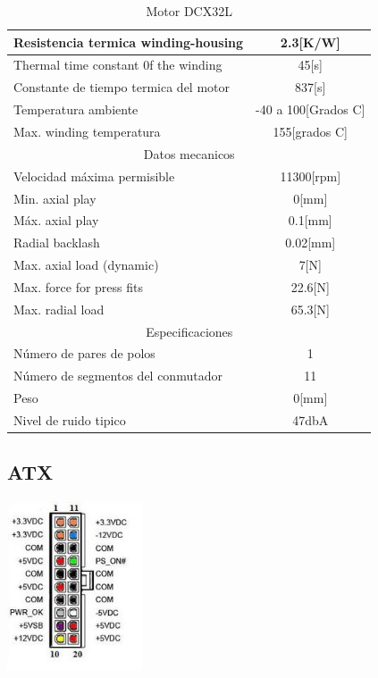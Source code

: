 \documentclass[a4paper]{book}
\begin{document}
\begin{table}[H]
\begin{center}
\begin{tabular}{|l|l|}
Resistencia termica winding-housing & \multicolumn{1}{|c|}{2.3[K/W]}\\ \hline
Thermal time constant 0f the winding & \multicolumn{1}{|c|}{45[s]}\\ \hline
Constante de tiempo termica del motor & \multicolumn{1}{|c|}{837[s]}\\ \hline
Temperatura ambiente & \multicolumn{1}{|c|}{-40 a 100[Grados C]}\\ \hline
Max. winding temperatura & \multicolumn{1}{|c|}{155[grados C]}\\ \hline
\multicolumn{2}{|c|}{Datos mecanicos} \\ \hline %
Velocidad máxima permisible & \multicolumn{1}{|c|}{11300[rpm]}\\ \hline
Min. axial play & \multicolumn{1}{|c|}{0[mm]}\\ \hline
Máx. axial play & \multicolumn{1}{|c|}{0.1[mm]}\\ \hline
Radial backlash & \multicolumn{1}{|c|}{0.02[mm]}\\ \hline
Max. axial load (dynamic) & \multicolumn{1}{|c|}{7[N]}\\ \hline
Max. force for press fits & \multicolumn{1}{|c|}{22.6[N]}\\ \hline
Max. radial load & \multicolumn{1}{|c|}{65.3[N]}\\ \hline
\multicolumn{2}{|c|}{Especificaciones} \\ \hline %
Número de pares de polos & \multicolumn{1}{|c|}{1}\\ \hline
Número de segmentos del conmutador & \multicolumn{1}{|c|}{11}\\ \hline
Peso & \multicolumn{1}{|c|}{0[mm]}\\ \hline
Nivel de ruido tipico & \multicolumn{1}{|c|}{47dbA}\\ \hline



\end{tabular}
\caption{Motor DCX32L}
\label{Motor DCX32L}
\end{center}
\end{table}

\subsection{ATX}

\begin{center}
\includegraphics[width=0.3\textwidth]{Figures/Hardware/Partes/ATX.JPG}
\label{fig:Hardware:Partes:ATX}
\end{center}
\end{document}
